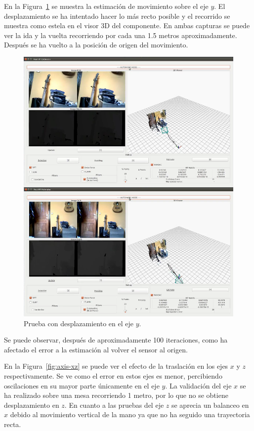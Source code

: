 En la Figura~\ref{fig:axis-y} se muestra la estimación de movimiento sobre el eje $y$. El desplazamiento se ha intentado hacer lo más recto posible y el recorrido se muestra como estela en el visor 3D del componente. En ambas capturas se puede ver la ida y la vuelta recorriendo por cada una 1.5 metros aproximadamente. Después se ha vuelto a la posición de origen del movimiento.

\begin{figure}[th]
\centering
\includegraphics[scale=0.3]{Figures/tests/axis-y.png}
\decoRule
\caption[Prueba con desplazamiento en el eje $y$]{Prueba con desplazamiento en el eje $y$.}
\label{fig:axis-y}
\end{figure}

Se puede observar, después de aproximadamente 100 iteraciones, como ha afectado el error a la estimación al volver el sensor al origen.

En la Figura~\ref{fig:axis-xz} se puede ver el efecto de la traslación en los ejes $x$ y $z$ respectivamente. Se ve como el error en estos ejes es menor, percibiendo oscilaciones en su mayor parte únicamente en el eje $y$. La validación del eje $x$ se ha realizado sobre una mesa recorriendo 1 metro, por lo que no se obtiene desplazamiento en $z$. En cuanto a las pruebas del eje $z$ se aprecia un balanceo en $x$ debido al movimiento vertical de la mano ya que no ha seguido una trayectoria recta.


